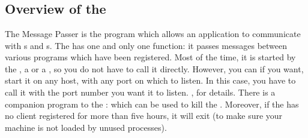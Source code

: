 
\part{\MP{}}



\chapter*{Overview of the \MP{}}


The Message Passer is the program which allows an application to communicate
with \CPK{}s and \XPK{}s. The \MP{} has one and only one function: it passes
messages between various programs which have been registered. Most of the time,
it is started by the \OPRSS{}, a \XPK{} or a \CPK{}, so you do not have to call
it directly.  However, you can if you want, start it on any host, with any port
on which to listen. In this case, you have to call it with the port number you
want it to listen. , for details. There is
a companion program to the \MP{}:  which can be used to kill the
\MP{}. Moreover, if the \MP{} has no client registered for more than five
hours, it will exit (to make sure your machine is not loaded by unused
\MP{} processes). 

